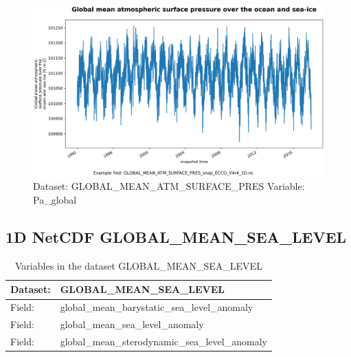 \begin{figure}[H]
\centering
\includegraphics[width=\textwidth]{../images/plots/oneD_plots/Global_Mean_Atmospheric_Pressure/Pa_global.png}
\caption{Dataset: GLOBAL\_MEAN\_ATM\_SURFACE\_PRES Variable: Pa\_global}
\label{tab:table-GLOBAL_MEAN_ATM_SURFACE_PRES_Pa_global-Plot}
\end{figure}
\pagebreak
\subsection{1D NetCDF GLOBAL\_MEAN\_SEA\_LEVEL}
\newp
\begin{longtable}{|p{}|p{}|}
\caption{Variables in the dataset GLOBAL\_MEAN\_SEA\_LEVEL}
\label{tab:table-GLOBAL_MEAN_SEA_LEVEL-fields} \\ 
\hline \endhead \hline \endfoot
\rowcolor{lightgray} \textbf{Dataset:} & \textbf{GLOBAL\_MEAN\_SEA\_LEVEL} \\ \hline
Field: &global\_mean\_barystatic\_sea\_level\_anomaly \\ \hline
Field: &global\_mean\_sea\_level\_anomaly \\ \hline
Field: &global\_mean\_sterodynamic\_sea\_level\_anomaly \\ \hline
\end{longtable}

\pagebreak
